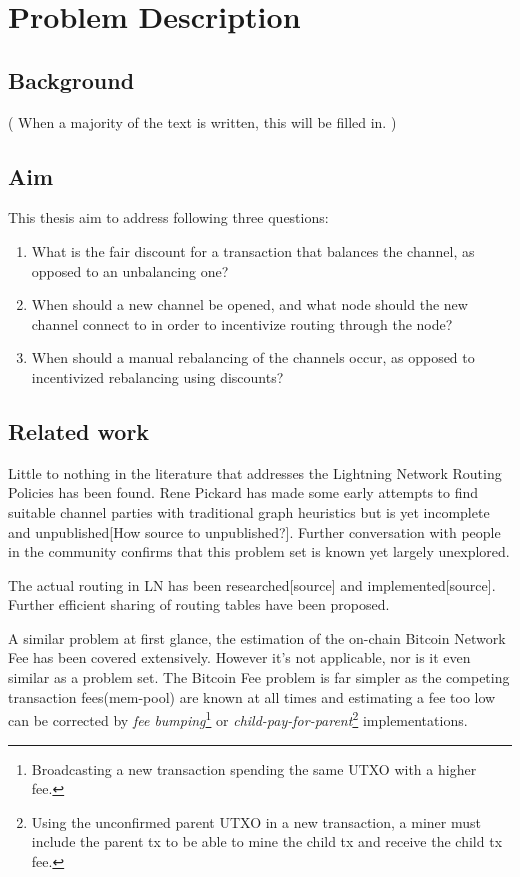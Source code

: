 \chapter{Problem Description}

\section{Background}
    \label{sec:background}

	( When a majority of the text is written, this will be filled in. )

\section{Aim}
    \label{sec:aim}

This thesis aim to address following three questions:

    \begin{enumerate}
	\item What is the fair discount for a transaction that balances the channel, as
		opposed to an unbalancing one?
	\item When should a new channel be opened, and what node should the new
		channel connect to in order to incentivize routing through the node?
	\item When should a manual rebalancing of the channels occur, as opposed to
		incentivized rebalancing using discounts?
    \end{enumerate}

\section{Related work}
    \label{sec:related_work}

	Little to nothing in the literature that addresses the Lightning Network Routing Policies has been found. Rene Pickard has made some early attempts to find suitable channel parties with traditional graph heuristics but is yet incomplete and unpublished[How source to unpublished?]. Further conversation with people in the community confirms that this problem set is known yet largely unexplored.
	
	The actual routing in LN has been researched[source] and implemented[source]. Further efficient sharing of routing tables have been proposed\cite{gunspan:marco:ant}.
	
	A similar problem at first glance, the estimation of the on-chain Bitcoin Network Fee has been covered extensively. However it's not applicable, nor is it even similar as a problem set. The Bitcoin Fee problem is far simpler as the competing transaction fees(mem-pool) are known at all times and estimating a fee too low can be corrected by \textit{fee bumping}\footnote{Broadcasting a new transaction spending the same UTXO with a higher fee.} or \textit{child-pay-for-parent}\footnote{Using the unconfirmed parent UTXO in a new transaction, a miner must include the parent tx to be able to mine the child tx and receive the child tx fee.} implementations.
	
